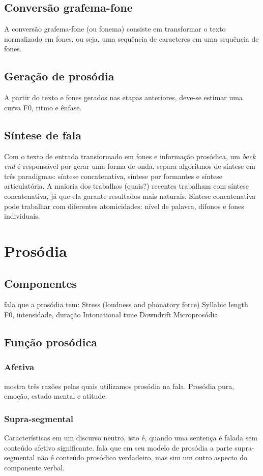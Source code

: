 \subsection{Conversão grafema-fone}
A conversão grafema-fone (ou fonema) consiste em transformar o texto normalizado
em fones, ou seja, uma sequência de caracteres em uma sequência de fones.

\subsection{Geração de prosódia}
A partir do texto e fones gerados nas etapas anteriores, deve-se estimar uma
curva F0, ritmo e ênfase.

\subsection{Síntese de fala}
Com o texto de entrada transformado em fones e informação prosódica, um
\emph{back end} é responsável por gerar uma forma de onda.
 separa algoritmos de síntese em três paradigmas:
síntese concatenativa, síntese por formantes e síntese articulatória. A maioria
dos trabalhos (quais?) recentes trabalham com síntese concatenativa, já que ela
garante resultados mais naturais. Síntese concatenativa pode trabalhar com
diferentes atomicidades: nível de palavra, dífonos e fones individuais.

\section{Prosódia}
\subsection{Componentes}
 fala que a prosódia tem:
Stress (loudness and phonatory force)
Syllabic length
F0, intensidade, duração
Intonational tune
Downdrift
Microprosódia
\subsection{Função prosódica}
\subsubsection{Afetiva}
 mostra três razões pelas quais utilizamos prosódia na fala.
Prosódia pura, emoção, estado mental e atitude. 
\subsubsection{Supra-segmental}
Características em um discurso neutro, isto é, quando uma sentença é falada sem
conteúdo afetivo significante.  fala que em seu modelo de
prosódia a parte supra-segmental não é conteúdo prosódico verdadeiro, mas sim
um outro aspecto do componente verbal.
